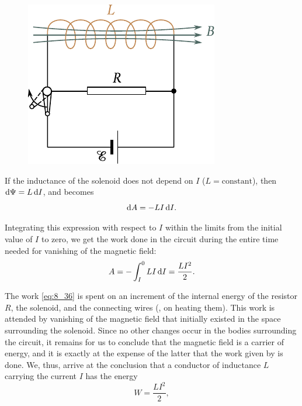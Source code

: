 \begin{figure}[t]
	\begin{center}
		\includegraphics[scale=0.95]{figures/ch_08/fig_8_11.pdf}
		\caption[]{}
		\label{fig:8_11}
	\end{center}
	\vspace{-0.8cm}
\end{figure}

If the inductance of the solenoid does not depend on $I$ ($L=\text{constant}$), then $\mathrm{d}\Psi=L\,\mathrm{d} I$, and  becomes
\begin{equation}\label{eq:8_35}
	\mathrm{d} A = - LI\, \mathrm{d} I.
\end{equation}

\noindent
Integrating this expression with respect to $I$ within the limits from the initial value of $I$ to zero, we get the work done in the circuit during the entire time needed for vanishing of the magnetic field:
\begin{equation}\label{eq:8_36}
	A = - \int_I^0 LI\, \mathrm{d} I = \frac{LI^2}{2}.
\end{equation}

The work \eqref{eq:8_36} is spent on an increment of the internal energy of the resistor $R$, the solenoid, and the connecting wires (\ie, on heating them).
This work is attended by vanishing of the magnetic field that initially existed in the space surrounding the solenoid.
Since no other changes occur in the bodies surrounding the circuit, it remains for us to conclude that the magnetic field is a carrier of energy, and it is exactly at the expense of the latter that the work given by  is done.
We, thus, arrive at the conclusion that a conductor of inductance $L$ carrying the current $I$ has the energy
\begin{equation}\label{eq:8_37}
	W = \frac{LI^2}{2},
\end{equation}

